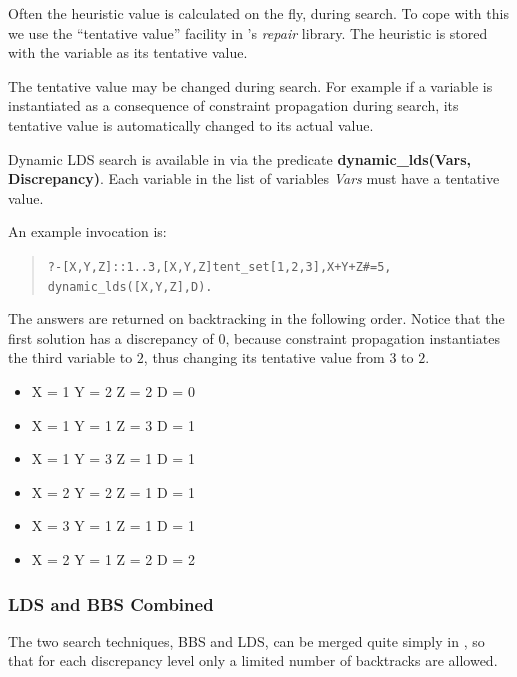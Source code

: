 Often the heuristic value is calculated on the fly, during search.  To
cope with this we use the {\eclipse} ``tentative value'' facility in
{\eclipse}'s {\em repair} library. 
The heuristic is stored with the variable as its tentative value. 

The tentative value may be changed during search.  For example if a
variable is instantiated as a consequence of constraint propagation
during search, its tentative value is automatically changed to its
actual value. 

Dynamic LDS search is available in {\eclipse} via the predicate
{\bf dynamic_lds(Vars, Discrepancy)}.
Each variable in the list of variables {\em Vars} 
must have a tentative value.

An example invocation is:
\begin{quote}\begin{alltt}
?- [X,Y,Z]::1..3, [X,Y,Z] tent_set [1,2,3], X+Y+Z#=5,
   dynamic_lds([X,Y,Z],D).
\end{alltt}\end{quote}
The answers are returned on backtracking in the following order.
Notice that the first solution has a discrepancy of $0$, because
constraint propagation instantiates the third variable to $2$,
thus changing its tentative value from $3$ to $2$.
\begin{itemize}
\item
X = 1
Y = 2
Z = 2
D = 0    
\item
X = 1
Y = 1
Z = 3
D = 1    
\item
X = 1
Y = 3
Z = 1
D = 1    
\item
X = 2
Y = 2
Z = 1
D = 1    
\item
X = 3
Y = 1
Z = 1
D = 1    
\item
X = 2
Y = 1
Z = 2
D = 2 
\end{itemize}

\subsubsection{LDS and BBS Combined}

The two search techniques, BBS and LDS, can be merged quite simply in
{\eclipse}, so that for each discrepancy level only a limited number of
backtracks are allowed.  

